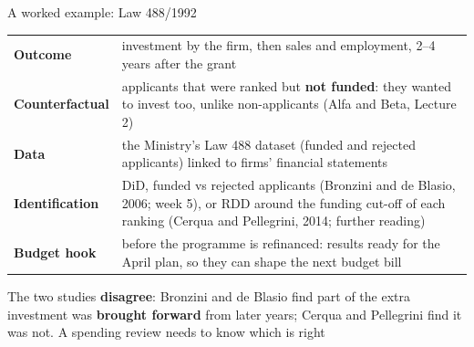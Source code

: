 \documentclass[aspectratio=169,xcolor=table]{beamer}
\begin{document}
\begin{frame}{A worked example: Law 488/1992}
\centering\footnotesize
\begin{tabular}{L{2.9cm}L{9.3cm}}
\toprule
\textbf{Outcome} & investment by the firm, then sales and employment, 2--4 years after the grant \\
\textbf{Counterfactual} & applicants that were ranked but \textbf{not funded}: they wanted to invest too, unlike non-applicants (Alfa and Beta, Lecture 2) \\
\textbf{Data} & the Ministry's Law 488 dataset (funded and rejected applicants) linked to firms' financial statements \\
\textbf{Identification} & DiD, funded vs rejected applicants (Bronzini and de Blasio, 2006; week 5), or RDD around the funding cut-off of each ranking (Cerqua and Pellegrini, 2014; further reading) \\
\textbf{Budget hook} & before the programme is refinanced: results ready for the April plan, so they can shape the next budget bill \\
\bottomrule
\end{tabular}
\vspace{0.1cm}

\raggedright\small
The two studies \textbf{disagree}: Bronzini and de Blasio find part of the extra investment was \textbf{brought forward} from later years; Cerqua and Pellegrini find it was not. A spending review needs to know which is right
\end{frame}

\renewcommand{\pelSectionBear}{plain}
\end{document}
